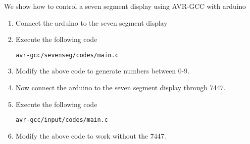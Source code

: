 We show how to control a seven segment display  using AVR-GCC with arduino
%
\begin{enumerate}[label=\arabic*.,ref=\theenumi]
\item Connect the arduino to the seven segment display 
\item Execute the following code
\begin{lstlisting}
avr-gcc/sevenseg/codes/main.c
\end{lstlisting}
\item Modify the above code to generate numbers between 0-9.
\item Now connect the arduino to the seven segment display  through 7447.
\item Execute the following code
\begin{lstlisting}
avr-gcc/input/codes/main.c
\end{lstlisting}
\item Modify the above code to work without the 7447.
\end{enumerate}


